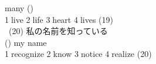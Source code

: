\documentclass[uplatex]{jsarticle}
\begin{document}
\hspace{10mm}many (\hspace{10mm})\\
\hspace{10mm}\textcircled{\normalsize1}live \textcircled{\normalsize2}life 
\textcircled{\normalsize3}heart \textcircled{\normalsize4}lives 
\hspace{\fill}(19)\underline{\hspace{35mm}}\\
\ (20) 私の名前を知っている\\
\hspace{10mm}(\hspace{10mm}) my name\\
\hspace{10mm}\textcircled{\normalsize1}recognize \textcircled{\normalsize2}know 
\textcircled{\normalsize3}notice \textcircled{\normalsize4}realize 
\hspace{\fill}(20)\underline{\hspace{35mm}}\\
% 
\end{document}

